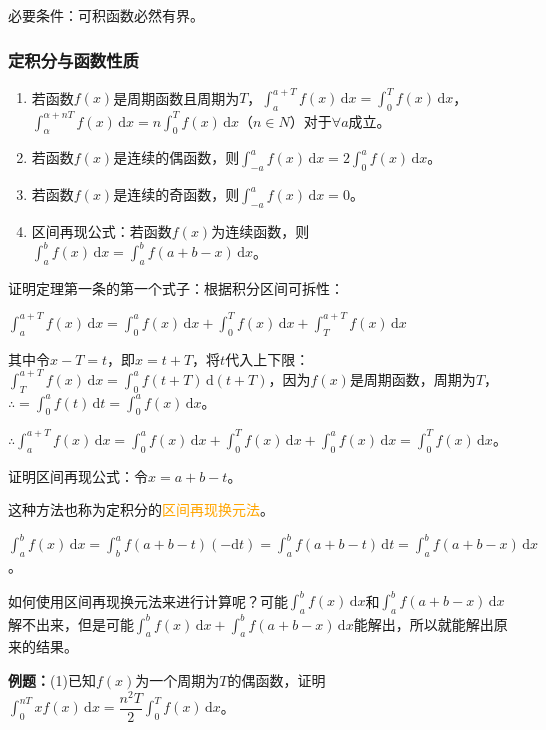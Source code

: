 \documentclass[UTF8, 12pt]{ctexart}
\begin{document}
        必要条件：可积函数必然有界。

        \subsubsection{定积分与函数性质}

        \begin{enumerate}
            \item 若函数$f(x)$是周期函数且周期为$T$，$\int_a^{a+T}f(x)\,\textrm{d}x=\int_0^Tf(x)\,\textrm{d}x$，\\$\int_\alpha^{\alpha+nT}f(x)\,\textrm{d}x=n\int_0^Tf(x)\,\textrm{d}x$（$n\in N$）对于$\forall a$成立。
            \item 若函数$f(x)$是连续的偶函数，则$\int_{-a}^af(x)\,\textrm{d}x=2\int_0^af(x)\,\textrm{d}x$。
            \item 若函数$f(x)$是连续的奇函数，则$\int_{-a}^af(x)\,\textrm{d}x=0$。
            \item 区间再现公式：若函数$f(x)$为连续函数，则$\int_a^bf(x)\,\textrm{d}x=\int_a^bf(a+b-x)\,\textrm{d}x$。
        \end{enumerate}

        证明定理第一条的第一个式子：根据积分区间可拆性：

        $\int_a^{a+T}f(x)\,\textrm{d}x=\int_0^af(x)\,\textrm{d}x+\int_0^Tf(x)\,\textrm{d}x+\int_T^{a+T}f(x)\,\textrm{d}x$

        其中令$x-T=t$，即$x=t+T$，将$t$代入上下限：$\int_T^{a+T}f(x)\,\textrm{d}x=\int_0^af(t+T)\,\textrm{d}(t+T)$，因为$f(x)$是周期函数，周期为$T$，$\therefore=\int_0^af(t)\,\textrm{d}t=\int_0^af(x)\,\textrm{d}x$。

        $\therefore\int_a^{a+T}f(x)\,\textrm{d}x=\int_0^af(x)\,\textrm{d}x+\int_0^Tf(x)\,\textrm{d}x+\int_0^af(x)\,\textrm{d}x=\int_0^Tf(x)\,\textrm{d}x$。

        证明区间再现公式：令$x=a+b-t$。

        这种方法也称为定积分的\textcolor{orange}{区间再现换元法}。

        $\int_a^bf(x)\,\textrm{d}x=\int_b^af(a+b-t)(-\textrm{d}t)=\int_a^bf(a+b-t)\,\textrm{d}t=\int_a^bf(a+b-x)\,\textrm{d}x$。

        如何使用区间再现换元法来进行计算呢？可能$\int_a^bf(x)\,\textrm{d}x$和$\int_a^bf(a+b-x)\,\textrm{d}x$解不出来，但是可能$\int_a^bf(x)\,\textrm{d}x+\int_a^bf(a+b-x)\,\textrm{d}x$能解出，所以就能解出原来的结果。

        \textbf{例题：}(1)已知$f(x)$为一个周期为$T$的偶函数，证明$\int_0^{nT}xf(x)\,\textrm{d}x=\dfrac{n^2T}{2}\int_0^Tf(x)\,\textrm{d}x$。
\end{document}
